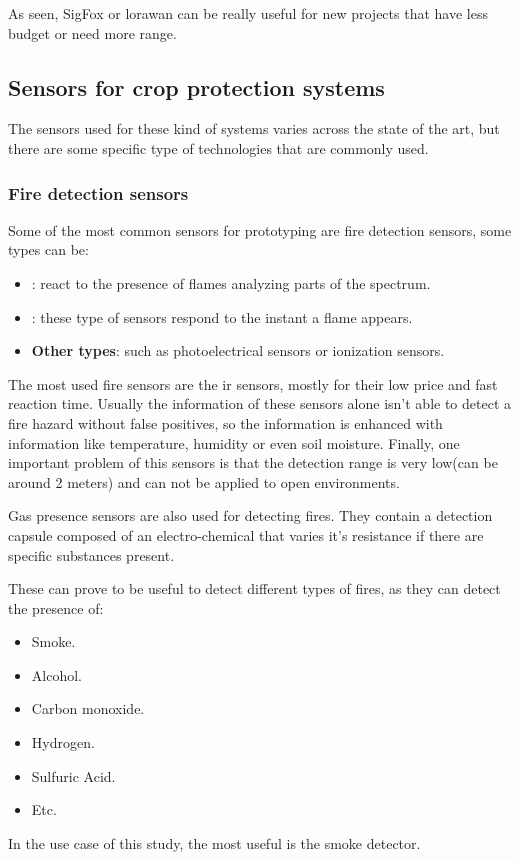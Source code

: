 As seen, SigFox or \acrshort{lorawan} can be really useful for new projects that have less budget or need more range.

\subsection{Sensors for crop protection systems}
The sensors used for these kind of systems varies across the state of the art, but there are some specific type of technologies 
that are commonly used.
\subsubsection*{Fire detection sensors}
Some of the most common sensors for prototyping are fire detection sensors, some types can be:
\begin{itemize}
    \item \textbf{}: react to the presence of flames analyzing parts of the spectrum.
    \item \textbf{}: these type of sensors respond to the instant a flame appears.
    \item \textbf{Other types}: such as photoelectrical sensors or ionization sensors.
\end{itemize}

The most used fire sensors are the \acrshort{ir} sensors, mostly for their low price and fast reaction time. Usually the information of these sensors 
alone isn't able to detect a fire hazard without false positives, so the information is enhanced with information like temperature, humidity or even 
soil moisture. Finally, one important problem of this sensors is that the detection range is very low(can be around 2 meters) and can not be applied to open environments.

Gas presence sensors are also used for detecting fires. They contain a detection capsule composed of an electro-chemical that varies it's resistance if there are specific substances present. 

These can prove to be useful to detect different types of fires, as they can detect the presence of:
\begin{itemize}
    \item Smoke.
    \item Alcohol.
    \item Carbon monoxide.
    \item Hydrogen.
    \item Sulfuric Acid.
    \item Etc.
\end{itemize}
In the use case of this study, the most useful is the smoke detector.

